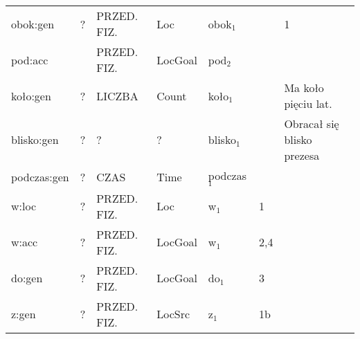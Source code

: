 \documentclass[a4paper, 12pt]{article}
\theoremstyle{remark}
\begin{document}
\begin{sidewaystable}
{\begin{tabular}{|p{2.5cm}|p{1.5cm}|p{2.5cm}|p{2cm}|p{2cm}|p{2cm}|p{10cm}|}
obok:gen         & ?                    & PRZED. FIZ.   & Loc                & obok$_1$          &                            & 1                                                                                                                                         \\
pod:acc          &                      & PRZED. FIZ. & LocGoal         & pod$_2$                      &                                                                                                                                          & \\
koło:gen         & ?                    & LICZBA               & Count              & koło$_1$          &                            & Ma koło pięciu lat.                                                                                                                       \\
blisko:gen       & ?                    & ?                    & ?                  & blisko$_1$        & & Obracał się blisko prezesa                                                                                                                                            \\
podczas:gen      & ?                    & CZAS                 & Time               & podczas$_1$       &                            &                                                                                                                                           \\
w:loc            & ?                    & PRZED. FIZ. & Loc             & w$_1$                        & 1                                          &                                                                                               \\
w:acc            & ?                    & PRZED. FIZ. & LocGoal         & w$_1$                        & 2,4                                        &                                                                                               \\
do:gen           & ?                    & PRZED. FIZ. & LocGoal         & do$_1$                       & 3                                          &                                                                                               \\
z:gen            & ?                    & PRZED. FIZ. & LocSrc          & z$_1$                        & 1b                                         &                                                                                               \\

\end{tabular}}
\end{sidewaystable}
\end{document}
